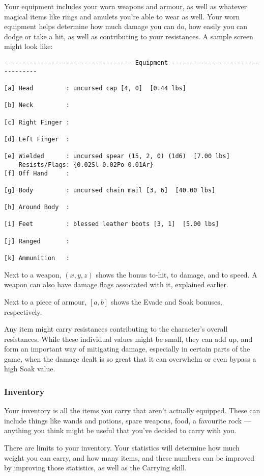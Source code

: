 Your equipment includes your worn weapons and armour, as well as whatever
magical items like rings and amulets you're able to wear as well.  Your
worn equipment helps determine how much damage you can do, how easily you can
dodge or take a hit, as well as contributing to your resistances.  A sample
screen might look like:

\begin{verbatim}
----------------------------------- Equipment ---------------------------------

[a] Head         : uncursed cap [4, 0]  [0.44 lbs]

[b] Neck         :

[c] Right Finger :

[d] Left Finger  :

[e] Wielded      : uncursed spear (15, 2, 0) (1d6)  [7.00 lbs] 
    Resists/Flags: {0.02Sl 0.02Po 0.01Ar}
[f] Off Hand     :

[g] Body         : uncursed chain mail [3, 6]  [40.00 lbs]

[h] Around Body  :

[i] Feet         : blessed leather boots [3, 1]  [5.00 lbs]

[j] Ranged       :

[k] Ammunition   :

\end{verbatim}

Next to a weapon, \((x, y, z)\) shows the bonus to-hit, to damage, and to speed.
A weapon can also have damage flags associated with it, explained earlier.

Next to a piece of armour, \([a, b]\) shows the Evade and Soak bonuses,
respectively.

Any item might carry resistances contributing to the character's overall
resistances.  While these individual values might be small, they can add up,
and form an important way of mitigating damage, especially in certain parts
of the game, when the damage dealt is so great that it can overwhelm or even
bypass a high Soak value.

\subsubsection{Inventory}

Your inventory is all the items you carry that aren't actually equipped.
These can include things like wands and potions, spare weapons, food, a
favourite rock --- anything you think might be useful that you've decided
to carry with you.  

There are limits to your inventory. Your statistics will determine how much
weight you can carry, and how many items, and these numbers can be improved
by improving those statistics, as well as the Carrying skill.
